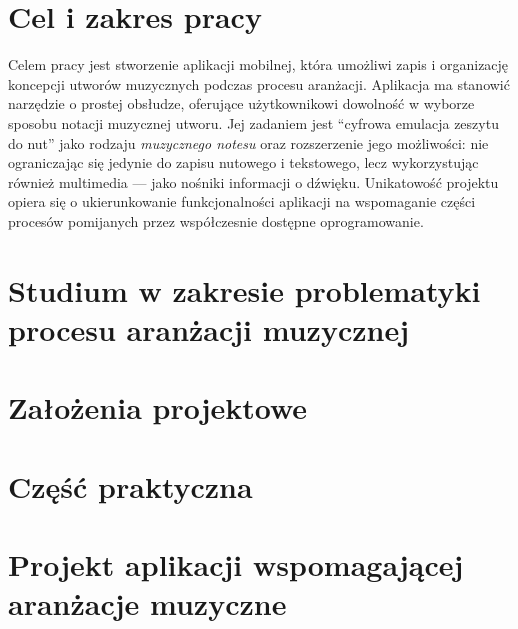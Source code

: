 \documentclass[12pt]{article}
\begin{document}
\newpage
{}
\section*{Cel i zakres pracy}
Celem pracy jest stworzenie aplikacji mobilnej, która umożliwi zapis i organizację koncepcji utworów muzycznych podczas procesu aranżacji.
Aplikacja ma stanowić narzędzie o prostej obsłudze, oferujące użytkownikowi dowolność w wyborze sposobu notacji muzycznej utworu.
Jej zadaniem jest \enquote{cyfrowa emulacja zeszytu do nut} jako rodzaju \textit{muzycznego notesu} oraz rozszerzenie jego możliwości: nie
ograniczając się jedynie do zapisu nutowego i tekstowego, lecz wykorzystując również multimedia — jako nośniki informacji o dźwięku.
Unikatowość projektu opiera się o ukierunkowanie funkcjonalności aplikacji na wspomaganie części procesów pomijanych przez współczesnie
dostępne oprogramowanie.

\newpage
\section{Studium w zakresie problematyki procesu aranżacji muzycznej}


\newpage
\section{Założenia projektowe}


\newpage
{}
\section*{Część praktyczna}
\section{Projekt aplikacji wspomagającej aranżacje muzyczne}


\newpage
\end{document}
